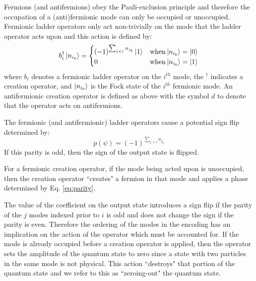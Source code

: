 Fermions (and antifermions) obey the Pauli-exclusion principle \cite{pauli1925zusammenhang} and therefore the occupation of a (anti)fermionic mode can only be occupied or unoccupied.
Fermionic ladder operators only act non-trivially on the mode that the ladder operator acts upon and this action is defined by:
\begin{equation}
    \label{eq:fermionic-creation}
    b_i^\dagger \ket{n_{i_b}} = 
    \begin{cases} 
        (-1)^{\sum_{j < i} n_{j_b}} \ket{1}  & {\rm when} \ket{n_{i_b}} = \ket{0} \\
        0 & {\rm when} \ket{n_{i_b}} = \ket{1}
    \end{cases}
\end{equation}
where $b_i$ denotes a fermionic ladder operator on the $i^{th}$ mode, the $^\dagger$ indicates a creation operator, and $\ket{n_{i_b}}$ is the Fock state of the $i^{th}$ fermionic mode.
An antifermionic creation operator is defined as above with the symbol $d$ to denote that the operator acts on antifermions.

The fermionic (and antifermionic) ladder operators cause a potential sign flip determined by:
\begin{equation}
    \label{eq:parity}
    p(\psi) = (-1)^{\sum_{j < i} n_{j_b}}
\end{equation}
If this parity is odd, then the sign of the output state is flipped.


For a fermionic creation operator, if the mode being acted upon is unoccupied, then the creation operator ``creates" a fermion in that mode and applies a phase determined by Eq. \ref{eq:parity}.


The value of the coefficient on the output state introduces a sign flip if the parity of the $j$ modes indexed prior to $i$ is odd and does not change the sign if the parity is even. 
Therefore the ordering of the modes in the encoding has an implication on the action of the operator which must be accounted for.
If the mode is already occupied before a creation operator is applied, then the operator sets the amplitude of the quantum state to zero since a state with two particles in the same mode is not physical.
This action ``destroys" that portion of the quantum state and we refer to this as ``zeroing-out" the quantum state. 

